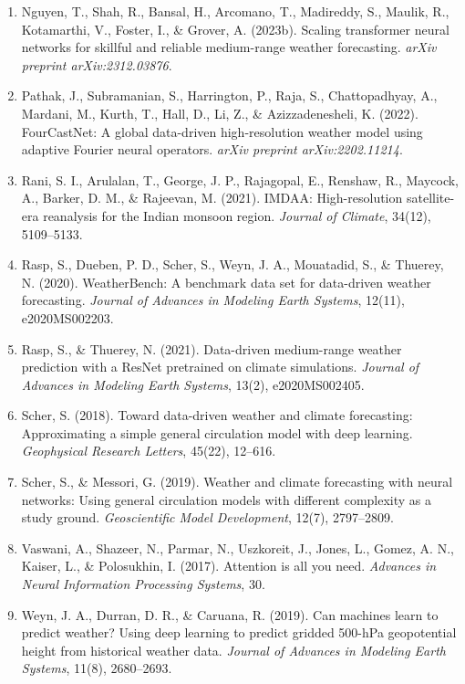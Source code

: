 \documentclass[12pt,a4paper,oneside]{report}
\begin{document}
\begin{enumerate}
    \item Nguyen, T., Shah, R., Bansal, H., Arcomano, T., Madireddy, S., Maulik, R., Kotamarthi, V., Foster, I., \& Grover, A. (2023b). Scaling transformer neural networks for skillful and reliable medium-range weather forecasting. \textit{arXiv preprint arXiv:2312.03876}.

    \item Pathak, J., Subramanian, S., Harrington, P., Raja, S., Chattopadhyay, A., Mardani, M., Kurth, T., Hall, D., Li, Z., \& Azizzadenesheli, K. (2022). FourCastNet: A global data-driven high-resolution weather model using adaptive Fourier neural operators. \textit{arXiv preprint arXiv:2202.11214}.

    \item Rani, S. I., Arulalan, T., George, J. P., Rajagopal, E., Renshaw, R., Maycock, A., Barker, D. M., \& Rajeevan, M. (2021). IMDAA: High-resolution satellite-era reanalysis for the Indian monsoon region. \textit{Journal of Climate}, 34(12), 5109--5133.

    \item Rasp, S., Dueben, P. D., Scher, S., Weyn, J. A., Mouatadid, S., \& Thuerey, N. (2020). WeatherBench: A benchmark data set for data-driven weather forecasting. \textit{Journal of Advances in Modeling Earth Systems}, 12(11), e2020MS002203.

    \item Rasp, S., \& Thuerey, N. (2021). Data-driven medium-range weather prediction with a ResNet pretrained on climate simulations. \textit{Journal of Advances in Modeling Earth Systems}, 13(2), e2020MS002405.

    \item Scher, S. (2018). Toward data-driven weather and climate forecasting: Approximating a simple general circulation model with deep learning. \textit{Geophysical Research Letters}, 45(22), 12--616.

    \item Scher, S., \& Messori, G. (2019). Weather and climate forecasting with neural networks: Using general circulation models with different complexity as a study ground. \textit{Geoscientific Model Development}, 12(7), 2797--2809.

    \item Vaswani, A., Shazeer, N., Parmar, N., Uszkoreit, J., Jones, L., Gomez, A. N., Kaiser, L., \& Polosukhin, I. (2017). Attention is all you need. \textit{Advances in Neural Information Processing Systems}, 30.

    \item Weyn, J. A., Durran, D. R., \& Caruana, R. (2019). Can machines learn to predict weather? Using deep learning to predict gridded 500-hPa geopotential height from historical weather data. \textit{Journal of Advances in Modeling Earth Systems}, 11(8), 2680--2693.
\end{enumerate}
\end{document}
